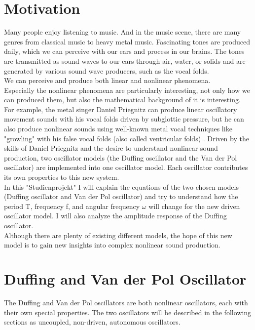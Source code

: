 \documentclass[oneside,10pt,a4paper]{report}
\begin{document}
	
	\tableofcontents
	\chapter{Motivation}
	
		Many people enjoy listening to music. And in the music scene, there are many genres from classical music to heavy metal music. Fascinating tones are produced daily, which we can perceive with our ears and process in our brains. The tones are transmitted as sound waves to our ears through air, water, or solids and are generated by various sound wave producers, such as the vocal folds.\\
		We can perceive and produce both linear and nonlinear phenomena. \\
		Especially the nonlinear phenomena are particularly interesting, not only how we can produced them, but also the mathematical background of it is interesting.\\
		 For example, the metal singer Daniel Priegnitz can produce linear oscillatory movement sounds with his vocal folds driven by subglottic pressure, but he can also produce nonlinear sounds using well-known metal vocal techniques like "growling" with his false vocal folds (also called ventricular folds) \cite{DanielPriegnitz}.
		 Driven by the skills of Daniel Priegnitz and the desire to understand nonlinear sound production, two oscillator models (the Duffing oscillator and the Van der Pol oscillator) are implemented into one oscillator model. Each oscillator contributes its own properties to this new system.\\
		 In this "Studienprojekt" I will explain the equations of the two chosen models (Duffing oscillator and Van der Pol oscillator) and try to understand how the period T, frequency f, and angular frequency $\omega$ will change for the new driven oscillator model. I will also analyze the amplitude response of the Duffing oscillator.\\
		 Although there are plenty of existing different models, the hope of this new model is to gain new insights into complex nonlinear sound production.\\
		
	\chapter{Duffing and Van der Pol Oscillator} \label{chapter: Duffing- and Van der Pol Oscillator}
	
		The Duffing and Van der Pol oscillators are both nonlinear oscillators, each with their own special properties. 
		The two oscillators will be described in the following sections as uncoupled, non-driven, autonomous oscillators.
		
\end{document}

